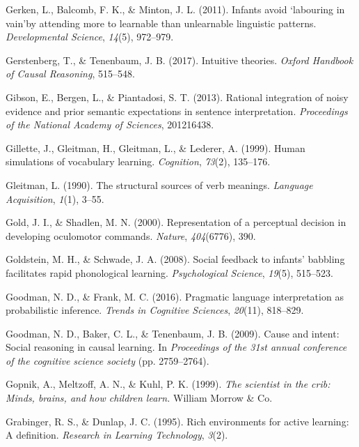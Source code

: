 \documentclass[oneside]{report}
\begin{document}
\hypertarget{ref-gerken2011infants}{}
Gerken, L., Balcomb, F. K., \& Minton, J. L. (2011). Infants avoid
`labouring in vain'by attending more to learnable than unlearnable
linguistic patterns. \emph{Developmental Science}, \emph{14}(5),
972--979.

\hypertarget{ref-gerstenberg2017intuitive}{}
Gerstenberg, T., \& Tenenbaum, J. B. (2017). Intuitive theories.
\emph{Oxford Handbook of Causal Reasoning}, 515--548.

\hypertarget{ref-gibson2013rational}{}
Gibson, E., Bergen, L., \& Piantadosi, S. T. (2013). Rational
integration of noisy evidence and prior semantic expectations in
sentence interpretation. \emph{Proceedings of the National Academy of
Sciences}, 201216438.

\hypertarget{ref-gillette1999human}{}
Gillette, J., Gleitman, H., Gleitman, L., \& Lederer, A. (1999). Human
simulations of vocabulary learning. \emph{Cognition}, \emph{73}(2),
135--176.

\hypertarget{ref-gleitman1990structural}{}
Gleitman, L. (1990). The structural sources of verb meanings.
\emph{Language Acquisition}, \emph{1}(1), 3--55.

\hypertarget{ref-gold2000representation}{}
Gold, J. I., \& Shadlen, M. N. (2000). Representation of a perceptual
decision in developing oculomotor commands. \emph{Nature},
\emph{404}(6776), 390.

\hypertarget{ref-goldstein2008social}{}
Goldstein, M. H., \& Schwade, J. A. (2008). Social feedback to infants'
babbling facilitates rapid phonological learning. \emph{Psychological
Science}, \emph{19}(5), 515--523.

\hypertarget{ref-goodman2016pragmatic}{}
Goodman, N. D., \& Frank, M. C. (2016). Pragmatic language
interpretation as probabilistic inference. \emph{Trends in Cognitive
Sciences}, \emph{20}(11), 818--829.

\hypertarget{ref-goodman2009cause}{}
Goodman, N. D., Baker, C. L., \& Tenenbaum, J. B. (2009). Cause and
intent: Social reasoning in causal learning. In \emph{Proceedings of the
31st annual conference of the cognitive science society} (pp.
2759--2764).

\hypertarget{ref-gopnik1999scientist}{}
Gopnik, A., Meltzoff, A. N., \& Kuhl, P. K. (1999). \emph{The scientist
in the crib: Minds, brains, and how children learn.} William Morrow \&
Co.

\hypertarget{ref-grabinger1995rich}{}
Grabinger, R. S., \& Dunlap, J. C. (1995). Rich environments for active
learning: A definition. \emph{Research in Learning Technology},
\emph{3}(2).
\end{document}
